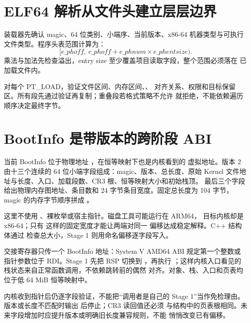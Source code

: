 \section{ELF64 解析从文件头建立层层边界}

装载器先确认 magic、64 位类别、小端序、当前版本、x86-64 机器类型与可执行
文件类型。程序头表范围计算为：
\[
  [e\_phoff,\ e\_phoff+e\_phnum\times e\_phentsize).
\]
乘法与加法先检查溢出，entry size 至少覆盖项目读取字段，整个范围必须落在
已加载文件内。

对每个 PT\_LOAD，验证文件区间、内存区间、、
对齐关系、权限和目标保留区。所有段先通过验证再复制；重叠段若格式策略不允许
就拒绝，不能依赖遍历顺序决定最终字节。

\section{BootInfo 是带版本的跨阶段 ABI}

当前 BootInfo 位于物理地址 ，在恒等映射下也是内核看到的
虚拟地址。版本 2 由十三个连续的 64 位小端字段组成：magic、版本、总长度、原始
Kernel 文件地址与长度、入口、加载段数、CR3 根、恒等映射大小和初始栈顶。
最后三个字段给出物理内存图地址、条目数和 24 字节条目宽度。固定总长度为
104 字节，magic 的内存字节顺序拼成 。

这里不使用 、裸枚举或宿主指针。磁盘工具可能运行在 ARM64，
目标内核却是 x86-64；只有  这样的固定宽度才能让两端对同一
偏移达成稳定解释。C++ 结构体通过  检查总大小，Stage 1
则用命名偏移逐字段写入。

交接寄存器只传一个 BootInfo 地址：System V AMD64 ABI 规定第一个整数或
指针参数位于 RDI。Stage 1 先把 RSP 切换到 ，再执行
；这样内核入口看见的栈状态来自正常函数调用，不依赖跳转前的偶然
对齐。对象、栈、入口和页表均位于低 64 MiB 恒等映射中。

内核收到指针后仍逐字段验证，不能把“调用者是自己的 Stage 1”当作免检理由。
版本或长度不匹配时输出  后停止；CR3 读回值还必须
与结构中的页表根相同。未来字段增加时应提升版本或明确旧长度兼容规则，不能
悄悄改变已有偏移。
